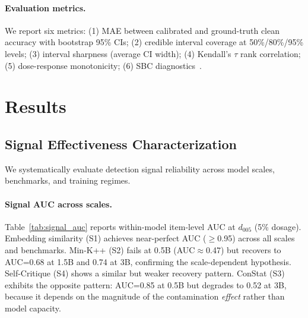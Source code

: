 \documentclass[11pt,a4paper]{article}
\begin{document}
\paragraph{Evaluation metrics.}
We report six metrics: (1) MAE between calibrated and ground-truth clean accuracy with bootstrap 95\% CIs; (2) credible interval coverage at 50\%/80\%/95\% levels; (3) interval sharpness (average CI width); (4) Kendall's $\tau$ rank correlation; (5) dose-response monotonicity; (6) SBC diagnostics~\citep{talts2018sbc}.

\section{Results}
\label{sec:results}

\subsection{Signal Effectiveness Characterization}
\label{sec:signals}

We systematically evaluate detection signal reliability across model scales, benchmarks, and training regimes.

\paragraph{Signal AUC across scales.}
Table~\ref{tab:signal_auc} reports within-model item-level AUC at $d_{005}$ (5\% dosage). Embedding similarity (S1) achieves near-perfect AUC ($\geq$0.95) across all scales and benchmarks. Min-K++ (S2) fails at 0.5B (AUC$\approx$0.47) but recovers to AUC=0.68 at 1.5B and 0.74 at 3B, confirming the scale-dependent hypothesis. Self-Critique (S4) shows a similar but weaker recovery pattern. ConStat (S3) exhibits the opposite pattern: AUC=0.85 at 0.5B but degrades to 0.52 at 3B, because it depends on the magnitude of the contamination \emph{effect} rather than model capacity.
\end{document}
